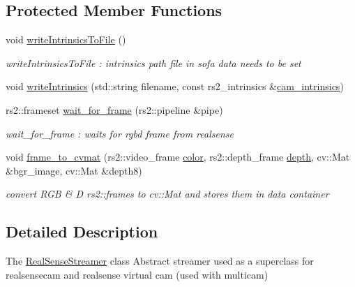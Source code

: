 \subsection*{Protected Member Functions}
\begin{DoxyCompactItemize}
\item 
void \hyperlink{classsofa_1_1rgbdtracking_1_1_real_sense_streamer_a1db9130e1444a18c5a5a3f19e8dc32da}{write\+Intrinsics\+To\+File} ()
\begin{DoxyCompactList}\small\item\em write\+Intrinsics\+To\+File \+: intrinsics path file in sofa data needs to be set \end{DoxyCompactList}\item 
void \hyperlink{classsofa_1_1rgbdtracking_1_1_real_sense_streamer_ae7f7303c5cc323868d3bcc36d13c8689}{write\+Intrinsics} (std\+::string filename, const rs2\+\_\+intrinsics \&\hyperlink{classsofa_1_1rgbdtracking_1_1_real_sense_streamer_a9f25b9a13cfab87d3e9878da5f2b6e32}{cam\+\_\+intrinsics})
\item 
rs2\+::frameset \hyperlink{classsofa_1_1rgbdtracking_1_1_real_sense_streamer_a3ea622968695865d727d67b72e8363c7}{wait\+\_\+for\+\_\+frame} (rs2\+::pipeline \&pipe)
\begin{DoxyCompactList}\small\item\em wait\+\_\+for\+\_\+frame \+: waits for rgbd frame from realsense \end{DoxyCompactList}\item 
void \hyperlink{classsofa_1_1rgbdtracking_1_1_real_sense_streamer_aac7fbd7301db4731d78aaf89a2022a01}{frame\+\_\+to\+\_\+cvmat} (rs2\+::video\+\_\+frame \hyperlink{classsofa_1_1rgbdtracking_1_1_real_sense_streamer_ac8353a52ed5997b5180bcc99f384c351}{color}, rs2\+::depth\+\_\+frame \hyperlink{classsofa_1_1rgbdtracking_1_1_real_sense_streamer_ae5a0ca709953b170ffb596abedd51eed}{depth}, cv\+::\+Mat \&bgr\+\_\+image, cv\+::\+Mat \&depth8)
\begin{DoxyCompactList}\small\item\em convert R\+GB \& D rs2\+::frames to cv\+::\+Mat and stores them in data container \end{DoxyCompactList}\end{DoxyCompactItemize}


\subsection{Detailed Description}
The \hyperlink{classsofa_1_1rgbdtracking_1_1_real_sense_streamer}{Real\+Sense\+Streamer} class Abstract streamer used as a superclass for realsensecam and realsense virtual cam (used with multicam) 


